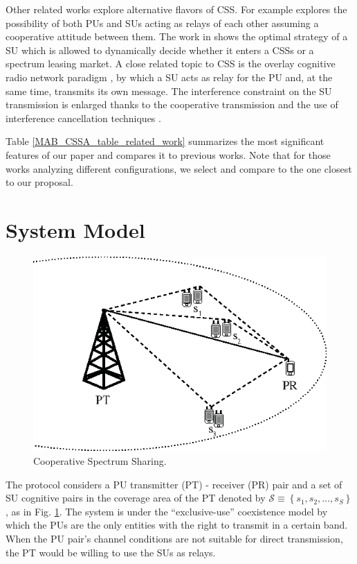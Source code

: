 Other related works explore alternative flavors of CSS. For example \cite{ref:Tran2014} explores the possibility of both PUs and SUs acting as relays of each other assuming a cooperative attitude between them. 
The work in \cite{ref:Shao2014} shows the optimal strategy of a SU which is allowed to dynamically decide whether it enters a CSSs or a spectrum leasing market. A close related topic to CSS is the overlay cognitive radio network paradigm \cite{ref:Goldsmith2009}, by which a SU acts as relay for the PU and, at the same time, transmits its own message. 
The interference constraint on the SU transmission is enlarged thanks to the cooperative transmission and the use of interference cancellation techniques \cite{ref:Han2010}. 

Table \ref{MAB_CSSA_table_related_work} summarizes the most significant features of our paper and compares it to previous works. 
Note that for those works analyzing different configurations, we select and compare to the one closest to our proposal. 

\section{System Model}\label{sec:Sys}

\begin{figure}[!t]
\centering
\includegraphics{geo.eps}
\caption{Cooperative Spectrum Sharing.}
\label{fig:geo}
\end{figure}

The protocol considers a PU transmitter (PT) - receiver (PR) pair and a set of SU cognitive pairs in the coverage area of the PT denoted by $\mathcal{S}\equiv\left\{s_1,s_2,\ldots,s_S\right\}$, as in Fig. \ref{fig:geo}.
The system is under the ``exclusive-use'' coexistence model by which the PUs are the only entities with the right to transmit in a certain band. 
When the PU pair's channel conditions are not suitable for direct transmission, the PT would be willing to use the SUs as relays.

